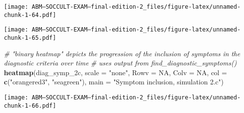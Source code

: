 \documentclass[]{article}
\newenvironment{Shaded}{\begin{snugshade}}{\end{snugshade}}
\newcommand{\KeywordTok}[1]{\textcolor[rgb]{0.13,0.29,0.53}{\textbf{#1}}}
\newcommand{\DataTypeTok}[1]{\textcolor[rgb]{0.13,0.29,0.53}{#1}}
\newcommand{\DecValTok}[1]{\textcolor[rgb]{0.00,0.00,0.81}{#1}}
\newcommand{\StringTok}[1]{\textcolor[rgb]{0.31,0.60,0.02}{#1}}
\newcommand{\CommentTok}[1]{\textcolor[rgb]{0.56,0.35,0.01}{\textit{#1}}}
\newcommand{\OtherTok}[1]{\textcolor[rgb]{0.56,0.35,0.01}{#1}}
\newcommand{\OperatorTok}[1]{\textcolor[rgb]{0.81,0.36,0.00}{\textbf{#1}}}
\newcommand{\NormalTok}[1]{#1}
\begin{document}
\texttt{[image: ABM---SOCCULT-EXAM---final-edition-2\_files/figure-latex/unnamed-chunk-1-64.pdf]}

\begin{Shaded}
\end{Shaded}

\texttt{[image: ABM---SOCCULT-EXAM---final-edition-2\_files/figure-latex/unnamed-chunk-1-65.pdf]}

\begin{Shaded}
\begin{Highlighting}[]
\CommentTok{# "binary heatmap" depicts the progression of the inclusion of symptoms in the diagnostic criteria over time}
\CommentTok{# uses output from find_diagnostic_symptoms()}
\KeywordTok{heatmap}\NormalTok{(diag_symp_2c, }\DataTypeTok{scale =} \StringTok{"none"}\NormalTok{, }\DataTypeTok{Rowv =} \OtherTok{NA}\NormalTok{, }\DataTypeTok{Colv =} \OtherTok{NA}\NormalTok{, }\DataTypeTok{col =} \KeywordTok{c}\NormalTok{(}\StringTok{"orangered3"}\NormalTok{, }\StringTok{"seagreen"}\NormalTok{), }\DataTypeTok{main =} \StringTok{"Symptom inclusion, simulation 2.c"}\NormalTok{) }
\end{Highlighting}
\end{Shaded}

\texttt{[image: ABM---SOCCULT-EXAM---final-edition-2\_files/figure-latex/unnamed-chunk-1-66.pdf]}
\end{document}
